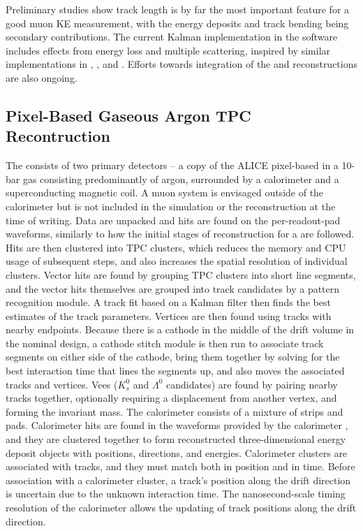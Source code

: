 \documentclass[../main-v1.tex]{subfiles}
\begin{document}
Preliminary studies show track length is by far the most important feature for a good muon KE measurement, with the energy deposits and track bending being secondary contributions. The current Kalman implementation in the  software includes effects from energy loss and multiple scattering, inspired by similar implementations in , , and . Efforts towards integration of the  and  reconstructions are also ongoing.

\subsection{Pixel-Based Gaseous Argon TPC Recontruction}
\label{sec:algo:reco:gartpc:pixels}

The  consists of two primary detectors -- a copy of the ALICE pixel-based  in a 10-bar gas consisting predominantly of argon, surrounded by a calorimeter and a superconducting magnetic coil.  A muon system is envisaged outside of the calorimeter but is not included in the simulation or the reconstruction at the time of writing.  Data are unpacked and hits are found on the per-readout-pad waveforms, similarly to how the initial stages of reconstruction for a  are followed.  Hits are then clustered into TPC clusters, which reduces the memory and CPU usage of subsequent steps, and also increases the spatial resolution of individual clusters.  Vector hits are found by grouping TPC clusters into short line segments, and the vector hits themselves are grouped into track candidates by a pattern recognition module.  A track fit based on a Kalman filter then finds the best estimates of the track parameters.  Vertices are then found using tracks with nearby endpoints.  Because there is a cathode in the middle of the drift volume in the nominal  design, 
a cathode stitch module is then run to associate track segments on either side of the cathode, bring them together by solving for the best interaction time that lines the segments up, and also moves the associated tracks and vertices.  Vees ($K^0_s$ and
$\Lambda^0$ candidates) are found by pairing nearby tracks together, optionally requiring a displacement from another vertex, and forming the invariant mass.  The calorimeter consists of a mixture of strips and pads.  Calorimeter hits are found in the  waveforms provided by the calorimeter , and they are clustered together to form reconstructed three-dimensional energy deposit objects with positions, directions, and energies.  Calorimeter clusters are associated with tracks, and they must match both in position and in time.  Before association with a calorimeter cluster, a track's position along the drift direction is uncertain due to the unknown interaction time.
The nanosecond-scale timing resolution of the calorimeter allows the updating of track positions along the drift direction.
\end{document}
